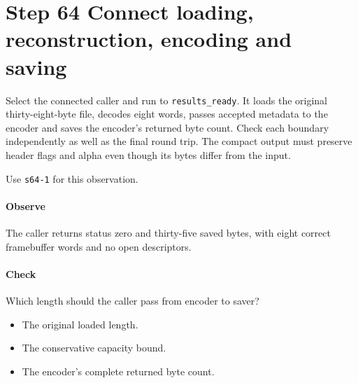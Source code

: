 \section{Step 64 Connect loading, reconstruction, encoding and saving}\label{qoi-s64}
Select the connected caller and run to \texttt{results\_ready}. It loads the original thirty-eight-byte file, decodes eight words, passes accepted metadata to the encoder and saves the encoder’s returned byte count. Check each boundary independently as well as the final round trip. The compact output must preserve header flags and alpha even though its bytes differ from the input.

Use \texttt{s64-1} for this observation.

\paragraph{Observe} The caller returns status zero and thirty-five saved bytes, with eight correct framebuffer words and no open descriptors.

\paragraph{Check} Which length should the caller pass from encoder to saver?
\begin{itemize}
\item[A.] The original loaded length.
\item[B.] The conservative capacity bound.
\item[C.] The encoder’s complete returned byte count.
\end{itemize}
